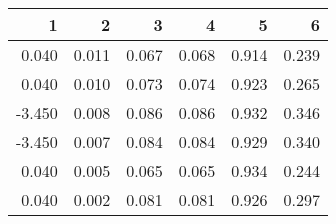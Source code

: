 \begin{table}[ht]
\centering
\begin{tabular}{rrrrrr}
  \hline
1 & 2 & 3 & 4 & 5 & 6 \\ 
  \hline
0.040 & 0.011 & 0.067 & 0.068 & 0.914 & 0.239 \\ 
  0.040 & 0.010 & 0.073 & 0.074 & 0.923 & 0.265 \\ 
  -3.450 & 0.008 & 0.086 & 0.086 & 0.932 & 0.346 \\ 
  -3.450 & 0.007 & 0.084 & 0.084 & 0.929 & 0.340 \\ 
  0.040 & 0.005 & 0.065 & 0.065 & 0.934 & 0.244 \\ 
  0.040 & 0.002 & 0.081 & 0.081 & 0.926 & 0.297 \\ 
   \hline
\end{tabular}
\end{table}
